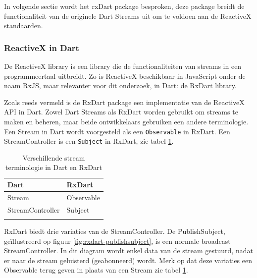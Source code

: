 In volgende sectie wordt het rxDart package besproken, deze package breidt de functionaliteit van de originele Dart Streams uit om te voldoen aan de ReactiveX standaarden.

\subsubsection{ReactiveX in Dart}
\label{ch:reactivex}
De ReactiveX library is een library die de functionaliteiten van streams in een programmeertaal uitbreidt. Zo is ReactiveX beschikbaar in JavaScript onder de naam RxJS, maar relevanter voor dit onderzoek, in Dart: de RxDart library.


Zoals reeds vermeld is de RxDart package een implementatie van de ReactiveX API in Dart. Zowel Dart Streams als RxDart worden gebruikt om streams te maken en beheren, maar beide ontwikkelaars gebruiken een andere terminologie.
Een Stream in Dart wordt voorgesteld als een \verb|Observable| in RxDart. Een StreamController is een \verb|Subject| in RxDart, zie tabel \ref{table:terminologie-rxdart-dart}.

\begin{table}[H]
    \centering
    \begin{tabular}{ll}
        \textbf{Dart}    & \textbf{RxDart} \\ \hline
        Stream           & Observable      \\
        StreamController & Subject         \\
        &                
    \end{tabular}
    \caption{Verschillende stream terminologie in Dart en RxDart \autocite{Boelens2018}}
    \label{table:terminologie-rxdart-dart}
\end{table}

RxDart biedt drie variaties van de StreamController.
\newline 
De PublishSubject, geïllustreerd op figuur \ref{fig:rxdart-publishsubject}, is een normale broadcast StreamController. In dit diagram wordt enkel data van de stream gestuurd, nadat er naar de stream geluisterd (geabonneerd) wordt.
Merk op dat deze variaties een Observable terug geven in plaats van een Stream zie tabel \ref{table:terminologie-rxdart-dart}.


